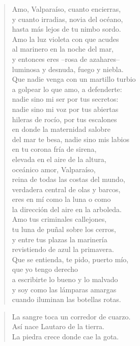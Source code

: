 \documentclass[12pt]{article}
\begin{document}
\clearpage
{}
\begin{verse}

Amo, Valparaíso, cuanto encierras,\\
y cuanto irradias, novia del océano,\\
hasta más lejos de tu nimbo sordo.\\
Amo la luz violeta con que acudes\\
al marinero en la noche del mar,\\
y entonces eres --rosa de azahares--\\
luminosa y desnuda, fuego y niebla.\\
Que nadie venga con un martillo turbio\\
a golpear lo que amo, a defenderte:\\
nadie sino mi ser por tus secretos:\\
nadie sino mi voz por tus abiertas\\
hileras de rocío, por tus escalones\\
en donde la maternidad salobre\\
del mar te besa, nadie sino mis labios\\
en tu corona fría de sirena,\\
elevada en el aire de la altura,\\
oceánico amor, Valparaíso,\\
reina de todas las costas del mundo,\\
verdadera central de olas y barcos,\\
eres en mí como la luna o como\\
la dirección del aire en la arboleda.\\
Amo tus criminales callejones,\\
tu luna de puñal sobre los cerros,\\
y entre tus plazas la marinería\\
revistiendo de azul la primavera.\\
Que se entienda, te pido, puerto mío,\\
que yo tengo derecho\\
a escribirte lo bueno y lo malvado\\
y soy como las lámparas amargas\\
cuando iluminan las botellas rotas.  

\end{verse}

\clearpage
{}
\begin{verse}

La sangre toca un corredor de cuarzo.\\
Así nace Lautaro de la tierra.\\
La piedra crece donde cae la gota.  

\end{verse}
\end{document}
